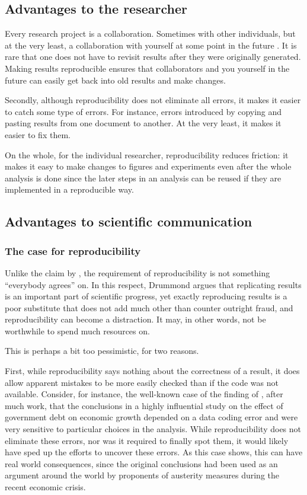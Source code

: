 \documentclass[runningheads,a4paper]{llncs}\usepackage[]{graphicx}\usepackage[]{color}
\begin{document}
\subsection{Advantages to the researcher}
Every research project is a collaboration. Sometimes with other individuals, but at the very least, a collaboration with yourself at some point in the future \cite[Ch. 13]{Wickham2015}. It is rare that one does not have to revisit results after they were originally generated. Making results reproducible ensures that collaborators and you yourself in the future can easily get back into old results and make changes.

Secondly, although reproducibility does not eliminate all errors, it makes it easier to catch some type of errors. For instance, errors introduced by copying and pasting results from one document to another. At the very least, it makes it easier to fix them.

On the whole, for the individual researcher, reproducibility reduces friction: it makes it easy to make changes to figures and experiments even after the whole analysis is done since the later steps in an analysis can be reused if they are implemented in a reproducible way.

\subsection{Advantages to scientific communication}

\subsubsection{The case for reproducibility}
Unlike the claim by \cite{Patil2016}, the requirement of reproducibility is not something ``everybody agrees'' on. In this respect, Drummond \cite{Drummond2009}  argues that replicating results is an important part of scientific progress, yet exactly reproducing results is a poor substitute that does not add much other than counter outright fraud, and reproducibility can become a distraction. It may, in other words, not be worthwhile to spend much resources on. 

This is perhaps a bit too pessimistic, for two reasons. 

First, while reproducibility says nothing about the correctness of a result, it does allow apparent mistakes to be more easily checked than if the code was not available. Consider, for instance, the well-known case of the finding of \cite{Herndon2014}, after much work, that the conclusions in a highly influential study on the effect of government debt on economic growth depended on a data coding error and were very sensitive to particular choices in the analysis. While reproducibility does not eliminate these errors, nor was it required to finally spot them, it would likely have sped up the efforts to uncover these errors. As this case shows, this can have real world consequences, since the original conclusions had been used as an argument around the world by proponents of austerity measures during the recent economic crisis.
\end{document}
